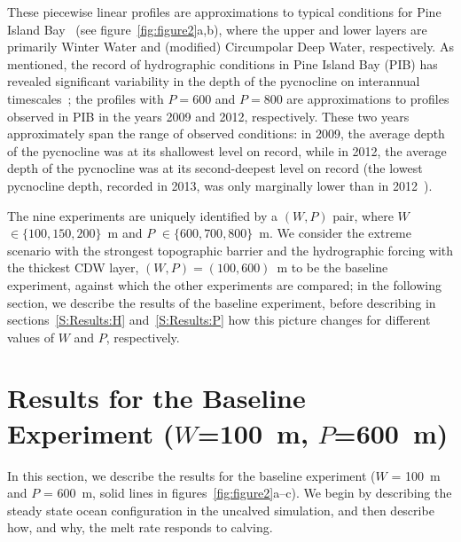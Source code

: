 \documentclass[draft]{agujournal2019}
\begin{document}
These piecewise linear profiles are approximations to typical conditions for Pine Island Bay~\cite{Jacobs1996GRL, Dutrieux2014Science, Jenkins2018NatureGeo} (see figure~\ref{fig:figure2}a,b), where the upper and lower layers are primarily Winter Water and (modified) Circumpolar Deep Water, respectively. As mentioned, the record of hydrographic conditions in Pine Island Bay (PIB) has revealed significant variability in the depth of the pycnocline on interannual timescales~\cite{Dutrieux2014Science}; the profiles with $P = 600$ and $P = 800$ are approximations to profiles observed in PIB in the years 2009 and 2012, respectively. These two years approximately span the range of observed conditions: in 2009, the average depth of the pycnocline was at its shallowest level on record, while in 2012, the average depth of the pycnocline was at its second-deepest level on record (the lowest pycnocline depth, recorded in 2013, was only marginally lower than in 2012~\cite{Webber2017NatureComms}).

The nine experiments are uniquely identified by a $(W,P)$ pair, where $W$ $\in \{100, 150, 200\}$~m and $P$ $\in \{600, 700, 800\}$~m. We consider the extreme scenario with the strongest topographic barrier and the hydrographic forcing with the thickest CDW layer, $(W,P) = (100,600)$~m to be the baseline experiment, against which the other experiments are compared; in the following section, we describe the results of the baseline experiment, before describing in sections~\ref{S:Results:H} and~\ref{S:Results:P} how this picture changes for different values of $W$ and $P$, respectively.


\section{Results for the Baseline Experiment ($W$=100~m, $P$=600~m)}\label{S:Baseline}
In this section, we describe the results for the baseline experiment ($W$ = 100~m and $P$ = 600~m, solid lines in figures~\ref{fig:figure2}a--c). We begin by describing the steady state ocean configuration in the uncalved simulation, and then describe how, and why, the melt rate responds to calving.
\end{document}
